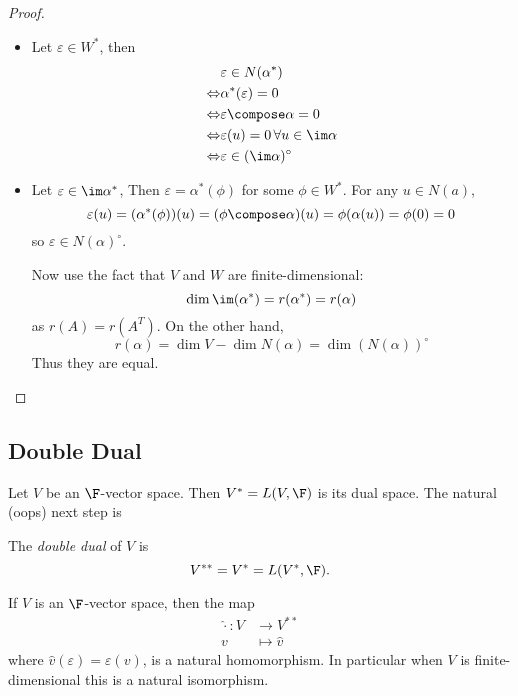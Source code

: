 \documentclass[a4paper]{article}
\newcommand*{\ann}{\circ}
\theoremstyle{definition}
\begin{document}
\begin{proof}\leavevmode
  \begin{itemize}
  \item Let \(\varepsilon \in W^*\), then
  \begin{align*}
    & \varepsilon \in N(\alpha^*) \\
    \Leftrightarrow & \alpha^* (\varepsilon) = 0 \\
    \Leftrightarrow & \varepsilon \compose \alpha = 0 \\
    \Leftrightarrow & \varepsilon(u) = 0 \, \forall u \in \im \alpha \\
    \Leftrightarrow & \varepsilon \in (\im \alpha)^\ann
  \end{align*}

\item Let \(\varepsilon \in \im \alpha^*\), Then \(\varepsilon = \alpha^* (\phi)\) for some \(\phi \in W^*\). For any \(u \in N(a)\),
  \[
    \varepsilon(u) = (\alpha^*(\phi))(u) = (\phi\compose \alpha)(u) = \phi(\alpha(u)) = \phi(0) = 0
  \]
  so \(\varepsilon \in N(\alpha)^\ann\).

  Now use the fact that \(V\) and \(W\) are finite-dimensional:
  \[
    \dim \im(\alpha^*) = r(\alpha^*) = r(\alpha)
  \]
  as \(r(A) = r(A^T)\). On the other hand,
  \[
    r(\alpha) = \dim V - \dim N(\alpha) = \dim (N(\alpha))^\ann
  \]
  Thus they are equal.
\end{itemize}
\end{proof}

\subsection{Double Dual}

Let \(V\) be an \(\F\)-vector space. Then \(V^* = L(V,\F)\) is its dual space. The natural (oops) next step is

\begin{definition}
  The \emph{double dual} of \(V\) is
  \[
    V^{**} = V^* = L(V^*, \F).
  \]
\end{definition}

\begin{theorem}
  If \(V\) is an \(\F\)-vector space, then the map
  \begin{align*}
    \hat \cdot: V &\to V^{**} \\
    v &\mapsto \hat v
  \end{align*}
  where \(\hat v(\varepsilon) = \varepsilon(v)\), is a natural homomorphism. In particular when \(V\) is finite-dimensional this is a natural isomorphism.
\end{theorem}
\end{document}
